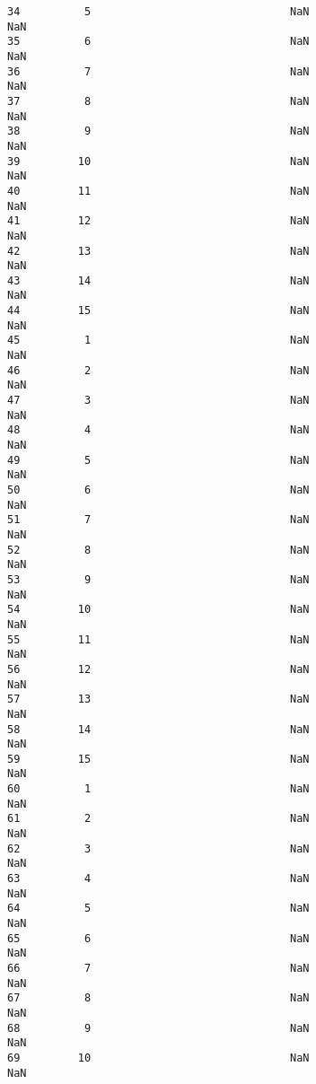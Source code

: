 \documentclass[11pt]{article}
\begin{document}
\begin{tcolorbox}[breakable, size=fbox, boxrule=.5pt, pad at break*=1mm, opacityfill=0]
\begin{Verbatim}[commandchars=\\\{\}]
34          5                               NaN                       NaN
35          6                               NaN                       NaN
36          7                               NaN                       NaN
37          8                               NaN                       NaN
38          9                               NaN                       NaN
39         10                               NaN                       NaN
40         11                               NaN                       NaN
41         12                               NaN                       NaN
42         13                               NaN                       NaN
43         14                               NaN                       NaN
44         15                               NaN                       NaN
45          1                               NaN                       NaN
46          2                               NaN                       NaN
47          3                               NaN                       NaN
48          4                               NaN                       NaN
49          5                               NaN                       NaN
50          6                               NaN                       NaN
51          7                               NaN                       NaN
52          8                               NaN                       NaN
53          9                               NaN                       NaN
54         10                               NaN                       NaN
55         11                               NaN                       NaN
56         12                               NaN                       NaN
57         13                               NaN                       NaN
58         14                               NaN                       NaN
59         15                               NaN                       NaN
60          1                               NaN                       NaN
61          2                               NaN                       NaN
62          3                               NaN                       NaN
63          4                               NaN                       NaN
64          5                               NaN                       NaN
65          6                               NaN                       NaN
66          7                               NaN                       NaN
67          8                               NaN                       NaN
68          9                               NaN                       NaN
69         10                               NaN                       NaN

\end{Verbatim}
\end{tcolorbox}
\end{document}
